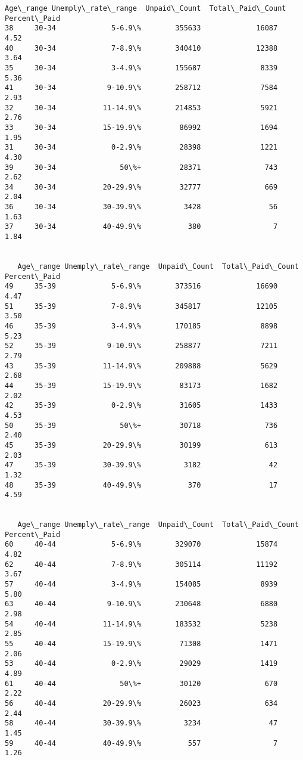 \documentclass[11pt]{article}
\begin{document}
\begin{Verbatim}[commandchars=\\\{\}]
   Age\_range Unemply\_rate\_range  Unpaid\_Count  Total\_Paid\_Count  Percent\_Paid
38     30-34             5-6.9\%        355633             16087          4.52
40     30-34             7-8.9\%        340410             12388          3.64
35     30-34             3-4.9\%        155687              8339          5.36
41     30-34            9-10.9\%        258712              7584          2.93
32     30-34           11-14.9\%        214853              5921          2.76
33     30-34           15-19.9\%         86992              1694          1.95
31     30-34             0-2.9\%         28398              1221          4.30
39     30-34               50\%+         28371               743          2.62
34     30-34           20-29.9\%         32777               669          2.04
36     30-34           30-39.9\%          3428                56          1.63
37     30-34           40-49.9\%           380                 7          1.84


   Age\_range Unemply\_rate\_range  Unpaid\_Count  Total\_Paid\_Count  Percent\_Paid
49     35-39             5-6.9\%        373516             16690          4.47
51     35-39             7-8.9\%        345817             12105          3.50
46     35-39             3-4.9\%        170185              8898          5.23
52     35-39            9-10.9\%        258877              7211          2.79
43     35-39           11-14.9\%        209888              5629          2.68
44     35-39           15-19.9\%         83173              1682          2.02
42     35-39             0-2.9\%         31605              1433          4.53
50     35-39               50\%+         30718               736          2.40
45     35-39           20-29.9\%         30199               613          2.03
47     35-39           30-39.9\%          3182                42          1.32
48     35-39           40-49.9\%           370                17          4.59


   Age\_range Unemply\_rate\_range  Unpaid\_Count  Total\_Paid\_Count  Percent\_Paid
60     40-44             5-6.9\%        329070             15874          4.82
62     40-44             7-8.9\%        305114             11192          3.67
57     40-44             3-4.9\%        154085              8939          5.80
63     40-44            9-10.9\%        230648              6880          2.98
54     40-44           11-14.9\%        183532              5238          2.85
55     40-44           15-19.9\%         71308              1471          2.06
53     40-44             0-2.9\%         29029              1419          4.89
61     40-44               50\%+         30120               670          2.22
56     40-44           20-29.9\%         26023               634          2.44
58     40-44           30-39.9\%          3234                47          1.45
59     40-44           40-49.9\%           557                 7          1.26



\end{Verbatim}
\end{document}

